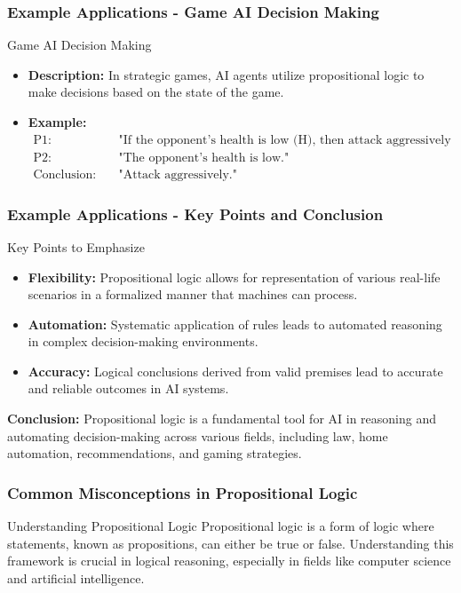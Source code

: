 \documentclass[aspectratio=169]{beamer}
\begin{document}
\begin{frame}[fragile]
    \frametitle{Example Applications - Game AI Decision Making}
    \begin{block}{Game AI Decision Making}
        \begin{itemize}
            \item \textbf{Description:} In strategic games, AI agents utilize propositional logic to make decisions based on the state of the game.
            \item \textbf{Example:}
            \begin{align*}
                \text{P1:} & \quad \text{"If the opponent's health is low (H), then attack aggressively (A)."} \\
                \text{P2:} & \quad \text{"The opponent's health is low."} \\
                \text{Conclusion:} & \quad \text{"Attack aggressively."}
            \end{align*}
        \end{itemize}
    \end{block}
\end{frame}

\begin{frame}[fragile]
    \frametitle{Example Applications - Key Points and Conclusion}
    \begin{block}{Key Points to Emphasize}
        \begin{itemize}
            \item \textbf{Flexibility:} Propositional logic allows for representation of various real-life scenarios in a formalized manner that machines can process.
            \item \textbf{Automation:} Systematic application of rules leads to automated reasoning in complex decision-making environments.
            \item \textbf{Accuracy:} Logical conclusions derived from valid premises lead to accurate and reliable outcomes in AI systems.
        \end{itemize}
    \end{block}
    
    \textbf{Conclusion:} Propositional logic is a fundamental tool for AI in reasoning and automating decision-making across various fields, including law, home automation, recommendations, and gaming strategies.
\end{frame}

\begin{frame}[fragile]
    \frametitle{Common Misconceptions in Propositional Logic}
    \begin{block}{Understanding Propositional Logic}
        Propositional logic is a form of logic where statements, known as propositions, can either be true or false. Understanding this framework is crucial in logical reasoning, especially in fields like computer science and artificial intelligence.
    \end{block}
\end{frame}
\end{document}
